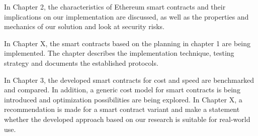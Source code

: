 In Chapter 2, the characteristics of Ethereum smart contracts and their implications on our implementation are discussed, as well as the properties and mechanics of our solution and look at security risks.

In Chapter X, the smart contracts based on the planning in chapter 1 are being implemented. The chapter describes the implementation technique, testing strategy and documents the established protocols.

In Chapter 3, the developed smart contracts for cost and speed are benchmarked and compared. In addition, a generic cost model for smart contracts is being introduced and optimization possibilities are being explored.
In Chapter X, a recommendation is made for a smart contract variant and make a statement whether the developed approach based on our research is suitable for real-world use.
